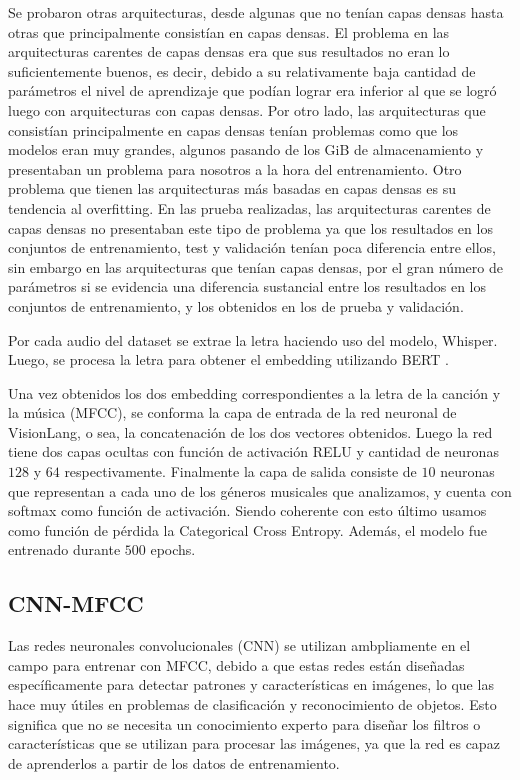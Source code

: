 \documentclass[colorinlistoftodos,twoside,twocolumn,10pt]{article} %
\begin{document}
Se probaron otras arquitecturas, desde algunas que no ten\'ian capas densas hasta otras que principalmente consist\'ian en capas densas. El problema en las arquitecturas carentes de capas densas era que sus resultados no eran lo suficientemente buenos, es decir, debido a su relativamente baja cantidad de par\'ametros el nivel de aprendizaje que pod\'ian lograr era inferior al que se logr\'o luego con arquitecturas con capas densas. Por otro lado, las arquitecturas que consist\'ian principalmente en capas densas ten\'ian problemas como que los modelos eran muy grandes, algunos pasando de los GiB de almacenamiento y presentaban un problema para nosotros a la hora del entrenamiento. Otro problema que tienen las arquitecturas m\'as basadas en capas densas es su tendencia al overfitting. En las prueba realizadas, las arquitecturas carentes de capas densas no presentaban este tipo de problema ya que los resultados en los conjuntos de entrenamiento, test y validaci\'on ten\'ian poca diferencia entre ellos, sin embargo en las arquitecturas que ten\'ian capas densas, por el gran n\'umero de par\'ametros si se evidencia una diferencia sustancial entre los resultados en los conjuntos de entrenamiento, y los obtenidos en los de prueba y validaci\'on. 


Por cada audio del dataset se extrae la letra haciendo uso del modelo, Whisper\cite{whisper}.  Luego, se procesa la letra para obtener el embedding utilizando BERT \cite{bert}.

Una vez obtenidos los dos embedding correspondientes a la letra de la canci\'on y la m\'usica (MFCC), se conforma la capa de entrada de la red neuronal de VisionLang, o sea, la concatenaci\'on de los dos vectores obtenidos. Luego la red tiene  dos capas ocultas con funci\'on de activaci\'on RELU y cantidad de neuronas $128$ y $64$ respectivamente. Finalmente la capa de salida consiste de $10$ neuronas que representan a cada uno de los g\'eneros musicales que analizamos, y cuenta con softmax como funci\'on de activaci\'on. Siendo coherente con esto \'ultimo usamos como funci\'on de p\'erdida la Categorical Cross Entropy. Adem\'as, el modelo fue entrenado durante $500$ epochs.

\subsection{CNN-MFCC}
Las redes neuronales convolucionales (CNN) se utilizan ambpliamente en el campo para entrenar con MFCC, debido a que estas redes est\'an dise\~nadas espec\'ificamente para detectar patrones y caracter\'isticas en im\'agenes, lo que las hace muy \'utiles en problemas de clasificaci\'on y reconocimiento de objetos. Esto significa que no se necesita un conocimiento experto para dise\~nar los filtros o caracter\'isticas que se utilizan para procesar las im\'agenes, ya que la red es capaz de aprenderlos a partir de los datos de entrenamiento.
\end{document}
